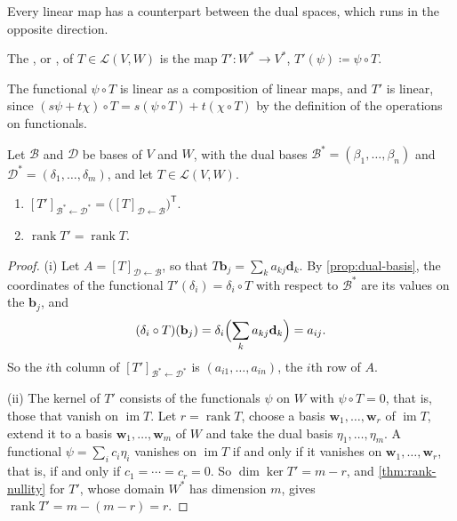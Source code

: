 Every linear map has a counterpart between the dual spaces, which runs in the opposite direction.

\begin{definition}
\label{def:dual-map}
The , or , of $T\in\mathcal L(V,W)$ is the map $T'\colon W^*\to V^*$, $T'(\psi)\coloneqq\psi\circ T$.
\end{definition}

The functional $\psi\circ T$ is linear as a composition of linear maps, and $T'$ is linear, since $(s\psi+t\chi)\circ T=s(\psi\circ T)+t(\chi\circ T)$ by the definition of the operations on functionals.

\begin{proposition}
\label{prop:dual-map}
Let $\mathcal B$ and $\mathcal D$ be bases of $V$ and $W$, with the dual bases $\mathcal B^*=(\beta_1,\ldots,\beta_n)$ and $\mathcal D^*=(\delta_1,\ldots,\delta_m)$, and let $T\in\mathcal L(V,W)$.
\begin{enumerate}
\item $[T']_{\mathcal B^*\leftarrow\mathcal D^*}=\bigl([T]_{\mathcal D\leftarrow\mathcal B}\bigr)^{\mathsf T}$.
\item $\operatorname{rank}T'=\operatorname{rank}T$.
\end{enumerate}
\end{proposition}

\begin{proof}
(i) Let $A=[T]_{\mathcal D\leftarrow\mathcal B}$, so that $T\mathbf b_j=\sum_ka_{kj}\mathbf d_k$. By \cref{prop:dual-basis}, the coordinates of the functional $T'(\delta_i)=\delta_i\circ T$ with respect to $\mathcal B^*$ are its values on the $\mathbf b_j$, and
\[
(\delta_i\circ T)(\mathbf b_j)=\delta_i\Bigl(\sum_ka_{kj}\mathbf d_k\Bigr)=a_{ij}.
\]
So the $i$th column of $[T']_{\mathcal B^*\leftarrow\mathcal D^*}$ is $(a_{i1},\ldots,a_{in})$, the $i$th row of $A$.

(ii) The kernel of $T'$ consists of the functionals $\psi$ on $W$ with $\psi\circ T=0$, that is, those that vanish on $\operatorname{im}T$. Let $r=\operatorname{rank}T$, choose a basis $\mathbf w_1,\ldots,\mathbf w_r$ of $\operatorname{im}T$, extend it to a basis $\mathbf w_1,\ldots,\mathbf w_m$ of $W$ and take the dual basis $\eta_1,\ldots,\eta_m$. A functional $\psi=\sum_ic_i\eta_i$ vanishes on $\operatorname{im}T$ if and only if it vanishes on $\mathbf w_1,\ldots,\mathbf w_r$, that is, if and only if $c_1=\cdots=c_r=0$. So $\dim\ker T'=m-r$, and \cref{thm:rank-nullity} for $T'$, whose domain $W^*$ has dimension $m$, gives $\operatorname{rank}T'=m-(m-r)=r$.
\end{proof}

